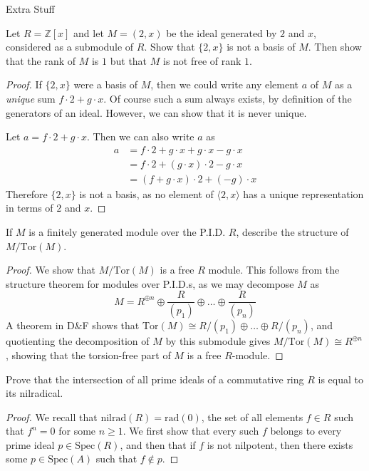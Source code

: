 \documentclass[12pt]{article}
\newcommand{\Z}{\mathbb{Z}}
\theoremstyle{definition}
\newenvironment{problem}[2][Problem]{\begin{trivlist}
\item[\hskip \labelsep {\bfseries #1}\hskip \labelsep {\bfseries #2.}]}{\end{trivlist}}
\begin{document}
\begin{section}{Extra Stuff}
\begin{problem}{1}
Let $R = \Z[x]$ and let $M = (2,x)$ be the ideal generated by $2$ and $x$, considered as a submodule of $R$. Show that $\{2,x\}$ is not a basis of $M$. Then show that the rank of $M$ is $1$ but that $M$ is not free of rank $1$.
\end{problem}
\begin{proof}
If $\{2,x\}$ were a basis of $M$, then we could write any element $a$ of $M$ as a \textit{unique} sum $f \cdot 2 + g \cdot x$. Of course such a sum always exists, by definition of the generators of an ideal. However, we can show that it is never unique.
\par Let $a = f \cdot 2 + g \cdot x$. Then we can also write $a$ as
\begin{align*}
    a &= f \cdot 2 + g \cdot x + g \cdot x - g \cdot x\\
    &= f \cdot 2 + (g \cdot x) \cdot 2 - g \cdot x\\
    &= (f + g \cdot x) \cdot 2 + (-g) \cdot x
\end{align*}
Therefore $\{2,x\}$ is not a basis, as no element of $\langle 2, x\rangle$ has a unique representation in terms of $2$ and $x$.
\end{proof}
\begin{problem}{2}
If $M$ is a finitely generated module over the P.I.D. $R$, describe the structure of $M / \text{Tor}(M)$.
\end{problem}
\begin{proof}
We show that $M / \text{Tor}(M)$ is a free $R$ module. This follows from the structure theorem for modules over P.I.D.s, as we may decompose $M$ as
\[
M = R^{\oplus n} \oplus \frac{R}{(p_1)} \oplus \dots \oplus \frac{R}{(p_n)}
\]
A theorem in D\&F shows that $\text{Tor}(M) \cong R/(p_1) \oplus \dots \oplus R/(p_n)$, and quotienting the decomposition of $M$ by this submodule gives $M/\text{Tor}(M) \cong R^{\oplus n}$, showing that the torsion-free part of $M$ is a free $R$-module.
\end{proof}
\begin{problem}{3}
Prove that the intersection of all prime ideals of a commutative ring $R$ is equal to its nilradical.
\end{problem}
\begin{proof}
We recall that $\text{nilrad}(R) = \text{rad}(0)$, the set of all elements $f \in R$ such that $f^n = 0$ for some $n \geq 1$. We first show that every such $f$ belongs to every prime ideal $p \in \text{Spec}(R)$, and then that if $f$ is not nilpotent, then there exists some $p \in \text{Spec}(A)$ such that $f \notin p$.

\end{proof}
\end{section}
\end{document}

